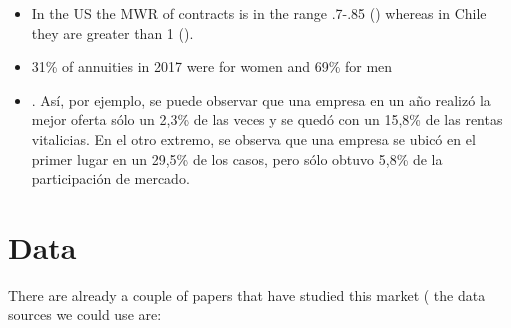\documentclass[12pt]{article}
\theoremstyle{plain}
\theoremstyle{plain}
\begin{document}
\begin{itemize}
    \item In the US the MWR of contracts is in the range .7-.85 (\cite{noauthor_lecture_annuities_nodate}) whereas in Chile they are greater than 1 (\cite{quiroz_estudio_2018}). 
    \item 31\% of annuities in 2017 were for women and 69\% for men 


    \item . Así, por ejemplo, se puede observar que una empresa en un año realizó la mejor oferta sólo un 2,3\% de las veces y se quedó con un 15,8\% de las rentas vitalicias. En el otro extremo, se observa que una empresa se ubicó en el primer lugar en un 29,5\% de los casos, pero sólo obtuvo 5,8\% de la participación de mercado. \textcite[p.13]{quiroz_estudio_2018}
\end{itemize}

\section{Data}
There are already a couple of papers that have studied this market (\cite{boehm_intermediation_2024,illanes_retirement_2019,alcalde_intermediary_nodate} the data sources we could use are: 
\end{document}
